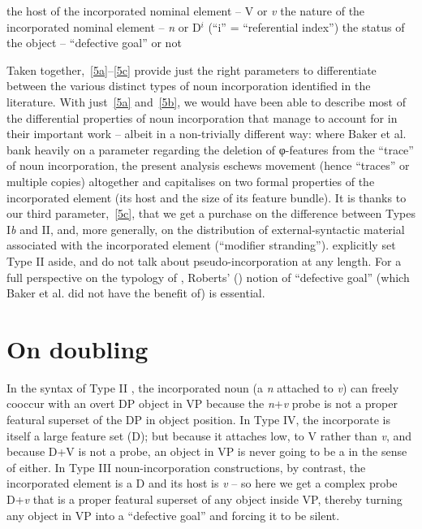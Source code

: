 \documentclass[output=paper]{langsci/langscibook}
\begin{document}
\begin{refcontext}
\begin{exe}
    \begin{xlist}
    \ex  the host of the incorporated nominal element -- V or \emph{v}
    \ex  the nature of the incorporated nominal element -- \emph{n} or D$^i$ (\enquote{i} = \enquote{referential index})
    \ex  the status of the object -- \enquote{defective goal} or not
    \end{xlist}
\end{exe}
Taken together,~\eqref{5a}--\eqref{5c} provide just the right parameters to
differentiate between the various distinct types of noun incorporation
identified in the literature. With just~\eqref{5a} and~\eqref{5b}, we would have
been able to describe most of the differential properties of noun incorporation
that \citet{bakeretal05}  manage to account for in their important work --
albeit in a non-trivially different way: where Baker et al. bank heavily on a
parameter regarding the deletion of φ{}-features from the \enquote{trace} of noun
incorporation, the present analysis eschews movement (hence \enquote{traces} or
multiple copies) altogether and capitalises on two formal properties of the
incorporated element (its host and the size of its feature bundle). It is
thanks to our third parameter,~\eqref{5c}, that we get a purchase on the
difference between Types I\emph{b} and II, and, more generally, on the
distribution of external-syntactic material associated with the incorporated
element (\enquote{modifier stranding}). \citet{bakeretal05} explicitly set Type II
aside, and do not talk about pseudo-incorporation at any length. For a full
perspective on the typology of , Roberts’
(\citeyear{Roberts2010}) notion of \enquote{defective goal} (which Baker et al. did
not have the benefit of) is essential.




\section{On doubling}
\label{sec:16.3}

In the syntax of Type II , the incorporated noun (a \emph{n}
attached to \emph{v}) can freely cooccur with an overt DP object in VP because
the \emph{n}+\emph{v} probe is not a proper featural superset of the DP in
object position. In Type IV, the incorporate is itself a large feature set (D);
but because it attaches low, to V rather than \emph{v}, and because D+V is not
a probe, an object in VP is never going to be a  in the sense of
\citet{Roberts2010} either. In Type III noun-incorporation constructions, by
contrast, the incorporated element is a D and its host is \emph{v} -- so here
we get a complex probe D+\emph{v} that is a proper featural superset of any
object inside VP, thereby turning any object in VP into a \enquote{defective
goal} and forcing it to be silent.


\end{refcontext}
\end{document}
